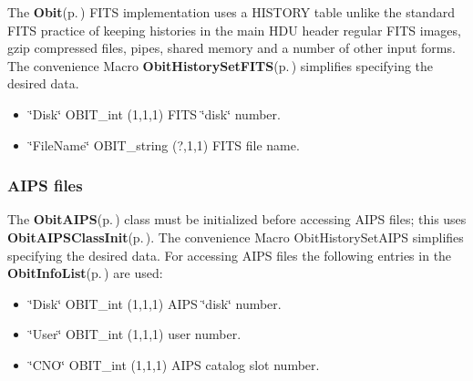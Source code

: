 The {\bf Obit}{\rm (p.\,\pageref{structObit})} FITS implementation uses a HISTORY table unlike the standard FITS practice of keeping histories in the main HDU header regular FITS images, gzip compressed files, pipes, shared memory and a number of other input forms. The convenience Macro {\bf Obit\-History\-Set\-FITS}{\rm (p.\,\pageref{ObitHistory_8h_a3})} simplifies specifying the desired data. \begin{itemize}
\item \char`\"{}Disk\char`\"{} OBIT\_\-int (1,1,1) FITS \char`\"{}disk\char`\"{} number. \item \char`\"{}File\-Name\char`\"{} OBIT\_\-string (?,1,1) FITS file name.\end{itemize}
\subsubsection{AIPS files}\label{ObitHistory_8h_ObitHistoryAIPS}
The {\bf Obit\-AIPS}{\rm (p.\,\pageref{structObitAIPS})} class must be initialized before accessing AIPS files; this uses {\bf Obit\-AIPSClass\-Init}{\rm (p.\,\pageref{ObitAIPS_8c_a5})}. The convenience Macro Obit\-History\-Set\-AIPS simplifies specifying the desired data. For accessing AIPS files the following entries in the {\bf Obit\-Info\-List}{\rm (p.\,\pageref{structObitInfoList})} are used: \begin{itemize}
\item \char`\"{}Disk\char`\"{} OBIT\_\-int (1,1,1) AIPS \char`\"{}disk\char`\"{} number. \item \char`\"{}User\char`\"{} OBIT\_\-int (1,1,1) user number. \item \char`\"{}CNO\char`\"{} OBIT\_\-int (1,1,1) AIPS catalog slot number.\end{itemize}
